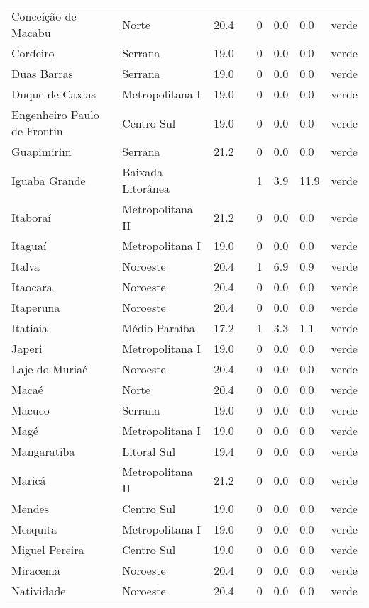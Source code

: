 \begin{longtable}{l|lllllll}
  Conceição de Macabu & Norte & 20.4 &  & 0 & 0.0 & 0.0 & verde \\ 
  Cordeiro & Serrana & 19.0 &  & 0 & 0.0 & 0.0 & verde \\ 
  Duas Barras & Serrana & 19.0 &  & 0 & 0.0 & 0.0 & verde \\ 
  Duque de Caxias & Metropolitana I & 19.0 &  & 0 & 0.0 & 0.0 & verde \\ 
  Engenheiro Paulo de Frontin & Centro Sul & 19.0 &  & 0 & 0.0 & 0.0 & verde \\ 
  Guapimirim & Serrana & 21.2 &  & 0 & 0.0 & 0.0 & verde \\ 
  Iguaba Grande & Baixada Litorânea &  &  & 1 & 3.9 & 11.9 & verde \\ 
  Itaboraí & Metropolitana II & 21.2 &  & 0 & 0.0 & 0.0 & verde \\ 
  Itaguaí & Metropolitana I & 19.0 &  & 0 & 0.0 & 0.0 & verde \\ 
  Italva & Noroeste & 20.4 &  & 1 & 6.9 & 0.9 & verde \\ 
  Itaocara & Noroeste & 20.4 &  & 0 & 0.0 & 0.0 & verde \\ 
  Itaperuna & Noroeste & 20.4 &  & 0 & 0.0 & 0.0 & verde \\ 
  Itatiaia & Médio Paraíba & 17.2 &  & 1 & 3.3 & 1.1 & verde \\ 
  Japeri & Metropolitana I & 19.0 &  & 0 & 0.0 & 0.0 & verde \\ 
  Laje do Muriaé & Noroeste & 20.4 &  & 0 & 0.0 & 0.0 & verde \\ 
  Macaé & Norte & 20.4 &  & 0 & 0.0 & 0.0 & verde \\ 
  Macuco & Serrana & 19.0 &  & 0 & 0.0 & 0.0 & verde \\ 
  Magé & Metropolitana I & 19.0 &  & 0 & 0.0 & 0.0 & verde \\ 
  Mangaratiba & Litoral Sul & 19.4 &  & 0 & 0.0 & 0.0 & verde \\ 
  Maricá & Metropolitana II & 21.2 &  & 0 & 0.0 & 0.0 & verde \\ 
  Mendes & Centro Sul & 19.0 &  & 0 & 0.0 & 0.0 & verde \\ 
  Mesquita & Metropolitana I & 19.0 &  & 0 & 0.0 & 0.0 & verde \\ 
  Miguel Pereira & Centro Sul & 19.0 &  & 0 & 0.0 & 0.0 & verde \\ 
  Miracema & Noroeste & 20.4 &  & 0 & 0.0 & 0.0 & verde \\ 
  Natividade & Noroeste & 20.4 &  & 0 & 0.0 & 0.0 & verde \\ 

\end{longtable}
